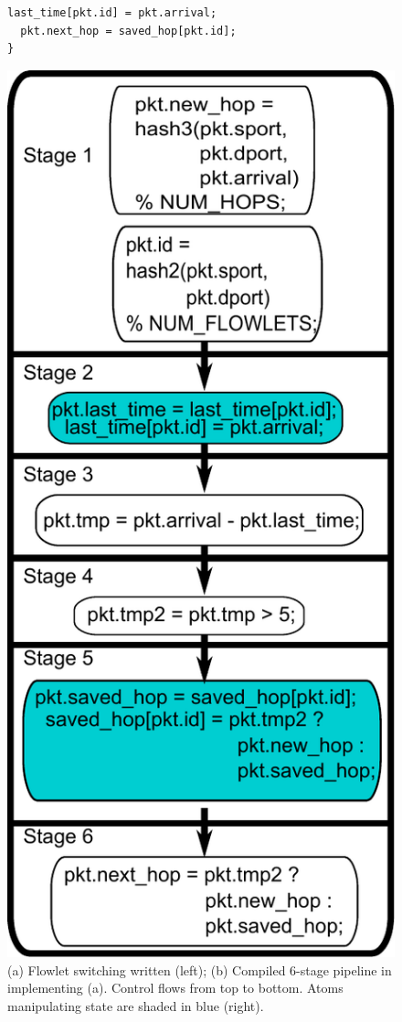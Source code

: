 \begin{figure}[!t]
\begin{minipage}{0.6\textwidth}
\begin{small}
\begin{lstlisting}[style=customc]
  last_time[pkt.id] = pkt.arrival;
  pkt.next_hop = saved_hop[pkt.id];
}
\end{lstlisting}
\end{small}
\end{minipage}
%
\vrule\quad
%
\begin{minipage}{0.4\textwidth}
\includegraphics[width=0.8\columnwidth]{pipe.pdf}
\end{minipage}
\caption{\small (a) Flowlet switching written \pktlanguage (left);
(b) Compiled 6-stage pipeline in \absmachine implementing (a).  Control flows
from top to bottom. Atoms manipulating state are shaded in blue (right).}
\label{fig:flowlet}
\end{figure}

